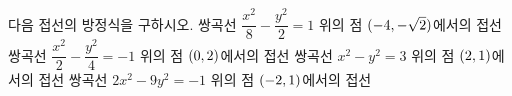다음 접선의 방정식을 구하시오.
 쌍곡선 $\dfrac{x^2}{8}-\dfrac{y^2}{2}=1$ 위의 점 $(-4{,}\mkern3mu\mathopen{}-\sqrt{2})$에서의 접선
 쌍곡선 $\dfrac{x^2}{2}-\dfrac{y^2}{4}=-1$ 위의 점 $(0{,}\mkern3mu\mathopen{}2)$에서의 접선
 쌍곡선 $x^2-y^2=3$ 위의 점 $(2{,}\mkern3mu\mathopen{}1)$에서의 접선
 쌍곡선 $2x^2-9y^2=-1$ 위의 점 $(-2{,}\mkern3mu\mathopen{}1)$에서의 접선
